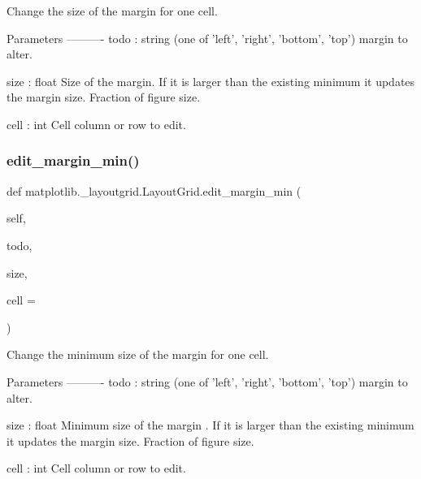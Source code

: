 \begin{DoxyVerb}Change the size of the margin for one cell.

Parameters
----------
todo : string (one of 'left', 'right', 'bottom', 'top')
    margin to alter.

size : float
    Size of the margin.  If it is larger than the existing minimum it
    updates the margin size. Fraction of figure size.

cell : int
    Cell column or row to edit.
\end{DoxyVerb}
 \mbox{\label{classmatplotlib_1_1__layoutgrid_1_1LayoutGrid_a2d219f765779564c03d1f232c635cd01}} 
\subsubsection{\texorpdfstring{edit\+\_\+margin\+\_\+min()}{edit\_margin\_min()}}
{\footnotesize\ttfamily def matplotlib.\+\_\+layoutgrid.\+Layout\+Grid.\+edit\+\_\+margin\+\_\+min (\begin{DoxyParamCaption}\item[{}]{self,  }\item[{}]{todo,  }\item[{}]{size,  }\item[{}]{cell = {} }\end{DoxyParamCaption})}

\begin{DoxyVerb}Change the minimum size of the margin for one cell.

Parameters
----------
todo : string (one of 'left', 'right', 'bottom', 'top')
    margin to alter.

size : float
    Minimum size of the margin .  If it is larger than the
    existing minimum it updates the margin size. Fraction of
    figure size.

cell : int
    Cell column or row to edit.
\end{DoxyVerb}
 \mbox{\label{classmatplotlib_1_1__layoutgrid_1_1LayoutGrid_ae868461e306e4b4ee55a0a6278e96ade}} 
